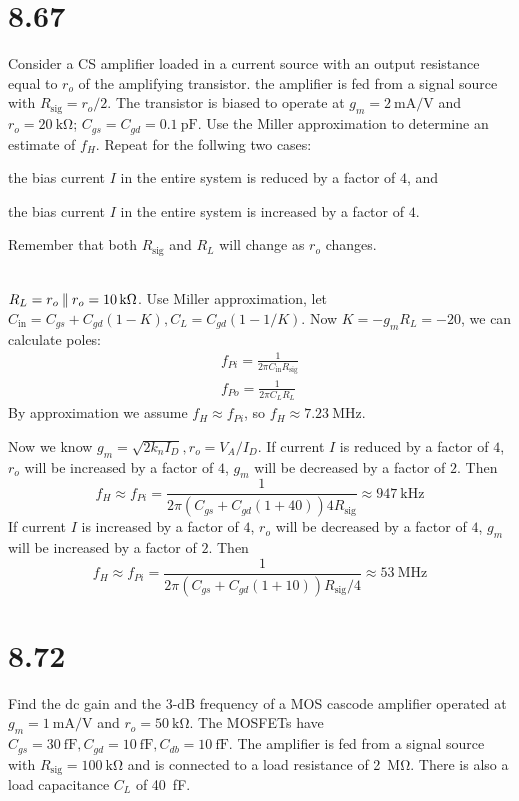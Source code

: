 \documentclass[12pt, a4paper]{article}
\begin{document}
\section{8.67}
Consider a CS amplifier loaded in a current source with an output resistance
equal to $r_o$ of the amplifying transistor. the amplifier is fed from a
signal source with $R_{\text{sig}} = r_o/2$. The transistor is biased to
operate at $g_m = \SI{2}{\mA/\V}$ and $r_o = \SI{20}{\kohm}$;
$C_{gs} = C_{gd} = \SI{0.1}{\pF}$. Use the Miller approximation to
determine an estimate of $f_H$. Repeat for the follwing two cases:
\begin{enumerate*}[(i)]
  \item the bias current $I$ in the entire system is reduced by a factor of
    $4$, and
  \item the bias current $I$ in the entire system is increased by a factor of
    $4$.
\end{enumerate*}
Remember that both $R_{\text{sig}}$ and $R_L$ will change as $r_o$ changes.

\Ans \\
$R_L = r_o \paral r_o = \SI{10}{\kohm}$.
Use Miller approximation, let $C_\text{in}=C_{gs}+C_{gd}(1-K),
C_L=C_{gd}(1-1/K)$. Now $K = -g_mR_L = -20$, we can calculate poles:
\begin{gather*}
  f_{Pi} = \frac{1}{2\pi C_\text{in} R_\text{sig}} \\
  f_{Po} = \frac{1}{2\pi C_L R_L}
\end{gather*}
By approximation we assume $f_H \approx f_{Pi}$,
so $f_H \approx \SI{7.23}{\MHz}$.

Now we know $g_m = \sqrt{2k_nI_D}, r_o = V_A/I_D$. If current $I$ is
reduced by a factor of $4$, $r_o$ will be increased by a factor of $4$,
$g_m$ will be decreased by a factor of $2$. Then
\[
  f_H \approx f_{Pi} = \frac{1}{2\pi (C_{gs}+C_{gd}(1+40)) 4R_\text{sig}}
  \approx \SI{947}{\kHz}
\]
If current $I$ is increased by a factor of $4$, $r_o$ will be decreased by
a factor of $4$, $g_m$ will be increased by a factor of $2$. Then
\[
  f_H \approx f_{Pi} = \frac{1}{2\pi (C_{gs}+C_{gd}(1+10)) R_\text{sig}/4}
  \approx \SI{53}{\MHz}
\]

\section{8.72}
Find the dc gain and the 3-dB frequency of a MOS cascode amplifier operated
at $g_m = \SI{1}{\mA/\V}$ and $r_o = \SI{50}{\kohm}$. The MOSFETs have
$C_{gs} = \SI{30}{\fF}, C_{gd} = \SI{10}{\fF}, C_{db} = \SI{10}{\fF}$.
The amplifier is fed from a signal source with
$R_{\text{sig}} = \SI{100}{\kohm}$ and is connected to a load resistance of
\SI{2}{\Mohm}. There is also a load capacitance $C_L$ of \SI{40}{\fF}.
\end{document}
